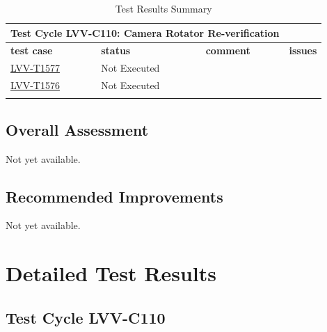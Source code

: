 \documentclass[SE,lsstdraft,STR,toc]{lsstdoc}
\begin{document}
\begin{longtable}{p{}p{}p{}p{}}
\toprule

  \multicolumn{3}{c}{ Test Cycle {\bf LVV-C110: Camera Rotator Re-verification
 }} \\\hline

  {\bf \footnotesize test case} & {\bf \footnotesize status} & {\bf \footnotesize comment} & {\bf \footnotesize issues} \\\toprule

    \href{https://jira.lsstcorp.org/secure/Tests.jspa#/testCase/LVV-T1577}{LVV-T1577}
    & Not Executed &
    \begin{minipage}[]{0.56\textwidth}
    \smallskip
    
    \medskip
    \end{minipage}
    &
    \\\hline
    \href{https://jira.lsstcorp.org/secure/Tests.jspa#/testCase/LVV-T1576}{LVV-T1576}
    & Not Executed &
    \begin{minipage}[]{0.56\textwidth}
    \smallskip
    
    \medskip
    \end{minipage}
    &
    \\\hline

\caption{Test Results Summary}
\label{table:summary}
\end{longtable}

\subsection{Overall Assessment}
\label{sect:overallassessment}

Not yet available.

\subsection{Recommended Improvements}
\label{sect:recommendations}

Not yet available.

\newpage
\section{Detailed Test Results}
\label{sect:detailedtestresults}


  \subsection{Test Cycle LVV-C110 }
\end{document}
